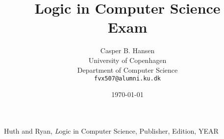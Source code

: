 \documentclass[10pt,a4paper]{article}
\title
{
	{\Large Logic in Computer Science}\\
	Exam
}
\author
{
	Casper B. Hansen\\
	University of Copenhagen\\
	Department of Computer Science\\
	{\tt fvx507@alumni.ku.dk}
}
\date{\today}
\begin{document}
\maketitle








\begin{thebibliography}{9}

	Huth and Ryan,
	{\emph Logic in Computer Science},
	Publisher,
	Edition,
	YEAR

\end{thebibliography}
\end{document}
